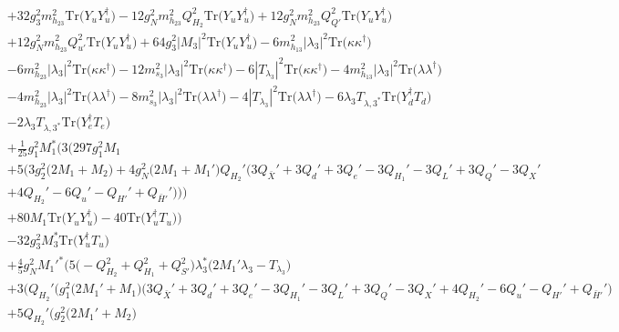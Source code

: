 {\begin{align}
 &+32 g_{3}^{2} m_{h_{23}}^2 \mbox{Tr}\Big({Y_u  Y_{u}^{\dagger}}\Big) -12 g_{N}^{2} m_{h_{23}}^2 Q_{H_2}^{2} \mbox{Tr}\Big({Y_u  Y_{u}^{\dagger}}\Big) +12 g_{N}^{2} m_{h_{23}}^2 Q_{Q'}^{2} \mbox{Tr}\Big({Y_u  Y_{u}^{\dagger}}\Big) \nonumber \\ 
 &+12 g_{N}^{2} m_{h_{23}}^2 Q_{u'}^{2} \mbox{Tr}\Big({Y_u  Y_{u}^{\dagger}}\Big) +64 g_{3}^{2} |M_3|^2 \mbox{Tr}\Big({Y_u  Y_{u}^{\dagger}}\Big) -6 m_{h_{13}}^2 |\lambda_3|^2 \mbox{Tr}\Big({\kappa  \kappa^{\dagger}}\Big) \nonumber \\ 
 &-6 m_{h_{23}}^2 |\lambda_3|^2 \mbox{Tr}\Big({\kappa  \kappa^{\dagger}}\Big) -12 m_{s_3}^2 |\lambda_3|^2 \mbox{Tr}\Big({\kappa  \kappa^{\dagger}}\Big) -6 |T_{\lambda_3}|^2 \mbox{Tr}\Big({\kappa  \kappa^{\dagger}}\Big) -4 m_{h_{13}}^2 |\lambda_3|^2 \mbox{Tr}\Big({\lambda  \lambda^{\dagger}}\Big) \nonumber \\ 
 &-4 m_{h_{23}}^2 |\lambda_3|^2 \mbox{Tr}\Big({\lambda  \lambda^{\dagger}}\Big) -8 m_{s_3}^2 |\lambda_3|^2 \mbox{Tr}\Big({\lambda  \lambda^{\dagger}}\Big) -4 |T_{\lambda_3}|^2 \mbox{Tr}\Big({\lambda  \lambda^{\dagger}}\Big) -6 \lambda_3 T_{{\lambda,3}^*} \mbox{Tr}\Big({Y_{d}^{\dagger}  T_d}\Big) \nonumber \\ 
 &-2 \lambda_3 T_{{\lambda,3}^*} \mbox{Tr}\Big({Y_{e}^{\dagger}  T_e}\Big) \nonumber \\ 
 &+\frac{1}{25} g_{1}^{2} M_1^* \Big(3 \Big(297 g_{1}^{2} M_1 \nonumber \\ 
 &+5 \Big(3 g_{2}^{2} \Big(2 M_1  + M_2\Big) + 4 g_{N}^{2} \Big(2 M_1  + M_1'\Big)Q_{H_2}' \Big(3 Q_{\bar{X}}'  + 3 Q_d'  + 3 Q_e'  -3 Q_{H_1}'  -3 Q_L'  + 3 Q_Q'  -3 Q_X' \nonumber\\
& + 4 Q_{H_2}'  -6 Q_u'  - Q_{H'}'  + Q_{\bar{H}'}'\Big)\Big)\Big)\nonumber \\ 
 &+80 M_1 \mbox{Tr}\Big({Y_u  Y_{u}^{\dagger}}\Big) -40 \mbox{Tr}\Big({Y_{u}^{\dagger}  T_u}\Big) \Big)\nonumber \\ 
 &-32 g_{3}^{2} M_3^* \mbox{Tr}\Big({Y_{u}^{\dagger}  T_u}\Big) \nonumber \\ 
 &+\frac{4}{5} g_{N}^{2} M_1'^* \Big(5 \Big(- Q_{H_2}^{2}  + Q_{H_1}^{2} + Q_{S'}^{2}\Big)\lambda_3^* \Big(2 M_1' \lambda_3  - T_{\lambda_3} \Big)\nonumber \\ 
 &+3 \Big(Q_{H_2}' \Big(g_{1}^{2} \Big(2 M_1'  + M_1\Big)\Big(3 Q_{\bar{X}}'  + 3 Q_d'  + 3 Q_e'  -3 Q_{H_1}'  -3 Q_L'  + 3 Q_Q'  -3 Q_X'  + 4 Q_{H_2}'  -6 Q_u'  - Q_{H'}'  + Q_{\bar{H}'}'\Big)\nonumber \\ 
 &+5 Q_{H_2}' \Big(g_{2}^{2} \Big(2 M_1'  + M_2\Big)\nonumber \\ 

\end{align}}
